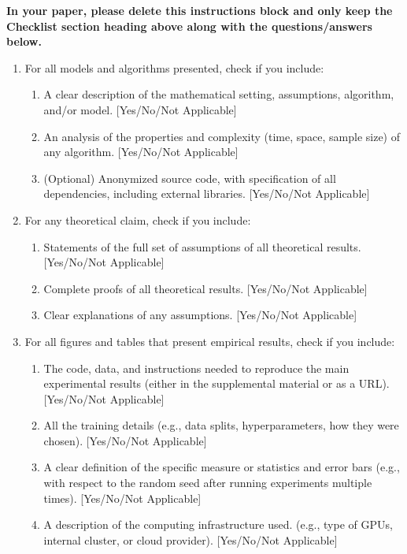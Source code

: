 \documentclass[twoside]{article}
\begin{document}
\textbf{In your paper, please delete this instructions block and only keep the Checklist section heading above along with the questions/answers below.}


 \begin{enumerate}


 \item For all models and algorithms presented, check if you include:
 \begin{enumerate}
   \item A clear description of the mathematical setting, assumptions, algorithm, and/or model. [Yes/No/Not Applicable]
   \item An analysis of the properties and complexity (time, space, sample size) of any algorithm. [Yes/No/Not Applicable]
   \item (Optional) Anonymized source code, with specification of all dependencies, including external libraries. [Yes/No/Not Applicable]
 \end{enumerate}


 \item For any theoretical claim, check if you include:
 \begin{enumerate}
   \item Statements of the full set of assumptions of all theoretical results. [Yes/No/Not Applicable]
   \item Complete proofs of all theoretical results. [Yes/No/Not Applicable]
   \item Clear explanations of any assumptions. [Yes/No/Not Applicable]     
 \end{enumerate}


 \item For all figures and tables that present empirical results, check if you include:
 \begin{enumerate}
   \item The code, data, and instructions needed to reproduce the main experimental results (either in the supplemental material or as a URL). [Yes/No/Not Applicable]
   \item All the training details (e.g., data splits, hyperparameters, how they were chosen). [Yes/No/Not Applicable]
         \item A clear definition of the specific measure or statistics and error bars (e.g., with respect to the random seed after running experiments multiple times). [Yes/No/Not Applicable]
         \item A description of the computing infrastructure used. (e.g., type of GPUs, internal cluster, or cloud provider). [Yes/No/Not Applicable]
 \end{enumerate}


\end{enumerate}
\end{document}
